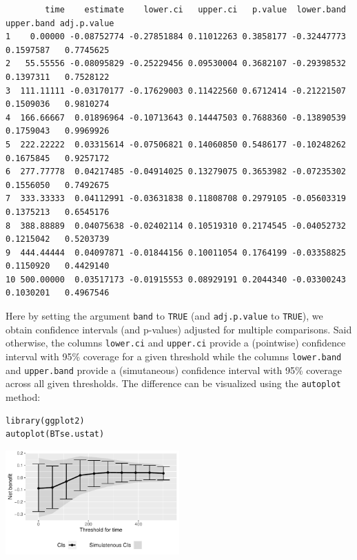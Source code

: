 \documentclass[12pt]{article}
\begin{document}
\begin{verbatim}
        time    estimate    lower.ci   upper.ci   p.value  lower.band upper.band adj.p.value
1    0.00000 -0.08752774 -0.27851884 0.11012263 0.3858177 -0.32447773  0.1597587   0.7745625
2   55.55556 -0.08095829 -0.25229456 0.09530004 0.3682107 -0.29398532  0.1397311   0.7528122
3  111.11111 -0.03170177 -0.17629003 0.11422560 0.6712414 -0.21221507  0.1509036   0.9810274
4  166.66667  0.01896964 -0.10713643 0.14447503 0.7688360 -0.13890539  0.1759043   0.9969926
5  222.22222  0.03315614 -0.07506821 0.14060850 0.5486177 -0.10248262  0.1675845   0.9257172
6  277.77778  0.04217485 -0.04914025 0.13279075 0.3653982 -0.07235302  0.1556050   0.7492675
7  333.33333  0.04112991 -0.03631838 0.11808708 0.2979105 -0.05603319  0.1375213   0.6545176
8  388.88889  0.04075638 -0.02402114 0.10519310 0.2174545 -0.04052732  0.1215042   0.5203739
9  444.44444  0.04097871 -0.01844156 0.10011054 0.1764199 -0.03358825  0.1150920   0.4429140
10 500.00000  0.03517173 -0.01915553 0.08929191 0.2044340 -0.03300243  0.1030201   0.4967546
\end{verbatim}

Here by setting the argument \texttt{band} to \texttt{TRUE} (and \texttt{adj.p.value} to
\texttt{TRUE}), we obtain confidence intervals (and p-values) adjusted for
multiple comparisons. Said otherwise, the columns \texttt{lower.ci} and
\texttt{upper.ci} provide a (pointwise) confidence interval with 95\% coverage
for a given threshold while the columns \texttt{lower.band} and \texttt{upper.band}
provide a (simutaneous) confidence interval with 95\% coverage across
all given thresholds. The difference can be visualized using the
\texttt{autoplot} method:
\lstset{language=r,label= ,caption= ,captionpos=b,numbers=none}
\begin{lstlisting}
library(ggplot2)
autoplot(BTse.ustat)
\end{lstlisting}

\begin{center}
\includegraphics[width=0.5\textwidth]{./figures/gg-sensitivity1.pdf}
\end{center}
\end{document}
